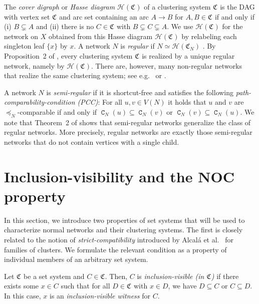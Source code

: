 \documentclass[preprint]{elsarticle}
\newcommand{\CS}[1][]{\ensuremath{\mathfrak{C}_{#1}}}
\DeclareMathOperator{\CC}{\mathtt{C}}
\newcommand{\Hasse}{\ensuremath{\mathcal{H}}}
\begin{document}
The \emph{cover digraph} or \emph{Hasse diagram} $\mathscr{H}(\CS)$
of a clustering system $\CS$ is the
DAG with vertex set $\CS$ and arc set containing an arc $A\to B$ for $A,B\in\CS$ if and only if (i)
$B\subsetneq A$ and (ii) there is no $C\in\CS$ with $B\subsetneq C\subsetneq A$. 
We use $\Hasse(\CS)$ for the network on $X$ obtained from this Hasse diagram $\mathscr{H}(\CS)$ by
relabeling each singleton leaf $\{x\}$ by $x$.  
A network $N$ is \emph{regular} if $ N\simeq\Hasse(\CS[N])$ \cite{Baroni:05}. 
By Proposition~2 of \cite{Hellmuth:2023}, every clustering system $\CS$ is realized 
by a unique regular network, namely by $\Hasse(\CS)$. There are, however, many 
non-regular networks that realize the same clustering system; see 
e.g.\ \cite[Fig.~8]{Hellmuth:2023} or \cite[Fig.~2]{LH:25}.



A network $N$ is \emph{semi-regular} if it is shortcut-free and satisfies the following
\emph{path-comparability-condition (PCC)}: For all $u, v \in V(N)$ it holds that $u$ and $v$ are
$\preceq_N$-comparable if and only if $\CC_N(u) \subseteq \CC_N(v)$ or $\CC_N(v) \subseteq
\CC_N(u)$. We note that Theorem~2 of \cite{Hellmuth:2023} shows that semi-regular networks
generalize the class of regular networks. More precisely, regular networks
are exactly those semi-regular networks that do not contain vertices with a single child.




\section{Inclusion-visibility and the NOC property}

In this section, we introduce two properties of set systems that will be used to characterize
normal networks and their clustering systems. The first is closely related to the notion of
\emph{strict-compatibility} introduced by Alcalá et al.~\cite{ALRR:14} for families of clusters.
We formulate the relevant condition as a property of individual members of an arbitrary set system.

\begin{definition}\label{def:inclusion-visible}
	Let $\CS$ be a set system and $C\in\CS$. Then, $C$ is \emph{inclusion-visible (in
	$\CS$)} if there exists some $x\in C$ such that for all $D\in\CS$ with $x\in D$, we have
	$D\subseteq C$ or $C\subseteq D$. In this case, $x$ is an \emph{inclusion-visible witness} for $C$.
\end{definition}
%
\end{document}
